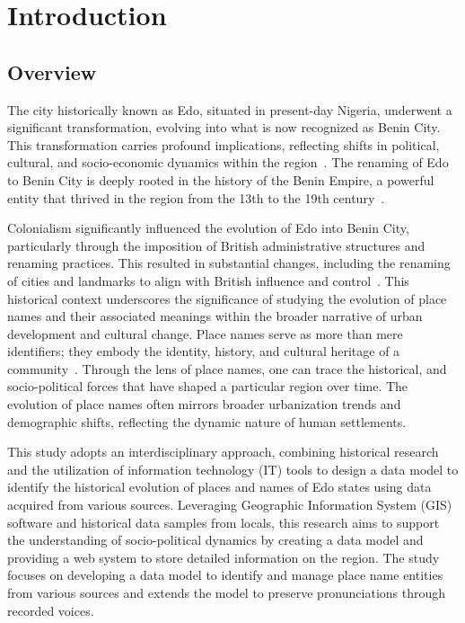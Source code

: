 \chapter{Introduction}
\section{Overview}
The city historically known as Edo, situated in present-day Nigeria, underwent a significant transformation, evolving into what is now recognized as Benin City. This transformation carries profound implications, reflecting shifts in political, cultural, and socio-economic dynamics within the region~\cite{Michael2023}. The renaming of Edo to Benin City is deeply rooted in the history of the Benin Empire, a powerful entity that thrived in the region from the 13th to the 19th century~\cite{egharevba1968short}. 

Colonialism significantly influenced the evolution of Edo into Benin City, particularly through the imposition of British administrative structures and renaming practices. This resulted in substantial changes, including the renaming of cities and landmarks to align with British influence and control~\cite{falola2008history}. This historical context underscores the significance of studying the evolution of place names and their associated meanings within the broader narrative of urban development and cultural change.
Place names serve as more than mere identifiers; they embody the identity, history, and cultural heritage of a community~\cite{Gelling}. Through the lens of place names, one can trace the historical, and socio-political forces that have shaped a particular region over time. The evolution of place names often mirrors broader urbanization trends and demographic shifts, reflecting the dynamic nature of human settlements.

This study adopts an interdisciplinary approach, combining historical research and the utilization of information technology (IT) tools to design a data model to identify the historical evolution of places and names of Edo states using data acquired from various sources. Leveraging Geographic Information System (GIS) software and historical data samples from locals, this research aims to support the understanding of socio-political dynamics by creating a data model and providing a web system to store detailed information on the region.
The study focuses on developing a data model to identify and manage place name entities from various sources and extends the model to preserve pronunciations through recorded voices.

